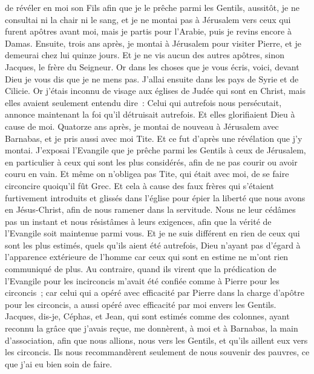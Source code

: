 \begin{multicols}{2}
de révéler en moi son Fils afin que je le prêche parmi les Gentils, aussitôt, je ne consultai ni la chair ni le sang,
et je ne montai pas à Jérusalem vers ceux qui furent apôtres avant moi, mais je partis pour l'Arabie, puis je revins encore à Damas.
Ensuite, trois ans après, je montai à Jérusalem pour visiter Pierre, et je demeurai chez lui quinze jours.
Et je ne vis aucun des autres apôtres, sinon Jacques, le frère du Seigneur.
Or dans les choses que je vous écris, voici, devant Dieu je vous dis que je ne mens pas.
J'allai ensuite dans les pays de Syrie et de Cilicie.
Or j'étais inconnu de visage aux églises de Judée qui sont en Christ,
mais elles avaient seulement entendu dire~: Celui qui autrefois nous persécutait, annonce maintenant la foi qu'il détruisait autrefois.
Et elles glorifiaient Dieu à cause de moi.
\VerseOne{}Quatorze ans après, je montai de nouveau à Jérusalem avec Barnabas, et je pris aussi avec moi Tite.
Et ce fut d'après une révélation que j'y montai. J'exposai l'Evangile que je prêche parmi les Gentils à ceux de Jérusalem, en particulier à ceux qui sont les plus considérés, afin de ne pas courir ou avoir couru en vain.
Et même on n'obligea pas Tite, qui était avec moi, de se faire circoncire quoiqu'il fût Grec.
Et cela à cause des faux frères qui s'étaient furtivement introduits et glissés dans l'église pour épier la liberté que nous avons en Jésus-Christ, afin de nous ramener dans la servitude.
Nous ne leur cédâmes pas un instant et nous résistâmes à leurs exigences, afin que la vérité de l'Evangile soit maintenue parmi vous.
Et je ne suis différent en rien de ceux qui sont les plus estimés, quels qu'ils aient été autrefois, Dieu n'ayant pas d'égard à l'apparence extérieure de l'homme car ceux qui sont en estime ne m'ont rien communiqué de plus.
Au contraire, quand ils virent que la prédication de l'Evangile pour les incirconcis m'avait été confiée comme à Pierre pour les circoncis~;
car celui qui a opéré avec efficacité par Pierre dans la charge d'apôtre pour les circoncis, a aussi opéré avec efficacité par moi envers les Gentils.
Jacques, dis-je, Céphas, et Jean, qui sont estimés comme des colonnes, ayant reconnu la grâce que j'avais reçue, me donnèrent, à moi et à Barnabas, la main d'association, afin que nous allions, nous vers les Gentils, et qu'ils aillent eux vers les circoncis.
Ils nous recommandèrent seulement de nous souvenir des pauvres, ce que j'ai eu bien soin de faire.

\end{multicols}

